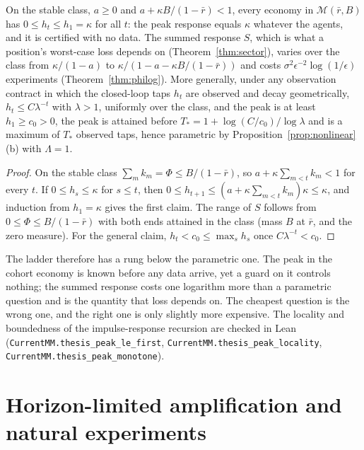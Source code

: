 \begin{corollary}\label{cor:peak}
On the stable class, $a\ge0$ and $a+\kappa B/(1-\bar r)<1$, every economy in $\mathcal M(\bar r,B)$ has $0\le h_t\le h_1=\kappa$ for all $t$: the peak response equals $\kappa$ whatever the agents, and it is certified with no data. The summed response $S$, which is what a position's worst-case loss depends on (Theorem~\ref{thm:sector}), varies over the class from $\kappa/(1-a)$ to $\kappa/(1-a-\kappa B/(1-\bar r))$ and costs $\sigma^2\epsilon^{-2}\log(1/\epsilon)$ experiments (Theorem~\ref{thm:philog}). More generally, under any observation contract in which the closed-loop taps $h_t$ are observed and decay geometrically, $h_t\le C\lambda^{-t}$ with $\lambda>1$, uniformly over the class, and the peak is at least $h_1\ge c_0>0$, the peak is attained before $T_*=1+\log(C/c_0)/\log\lambda$ and is a maximum of $T_*$ observed taps, hence parametric by Proposition~\ref{prop:nonlinear}(b) with $\Lambda=1$. \hfill\Proved
\end{corollary}

\begin{proof}
On the stable class $\sum_mk_m=\Phi\le B/(1-\bar r)$, so $a+\kappa\sum_{m<t}k_m<1$ for every $t$. If $0\le h_s\le\kappa$ for $s\le t$, then $0\le h_{t+1}\le(a+\kappa\sum_{m<t}k_m)\kappa\le\kappa$, and induction from $h_1=\kappa$ gives the first claim. The range of $S$ follows from $0\le\Phi\le B/(1-\bar r)$ with both ends attained in the class (mass $B$ at $\bar r$, and the zero measure). For the general claim, $h_t<c_0\le\max_sh_s$ once $C\lambda^{-t}<c_0$.
\end{proof}

The ladder therefore has a rung below the parametric one. The peak in the cohort economy is known before any data arrive, yet a guard on it controls nothing; the summed response costs one logarithm more than a parametric question and is the quantity that loss depends on. The cheapest question is the wrong one, and the right one is only slightly more expensive. The locality and boundedness of the impulse-response recursion are checked in Lean (\nolinkurl{CurrentMM.thesis_peak_le_first}, \nolinkurl{CurrentMM.thesis_peak_locality}, \nolinkurl{CurrentMM.thesis_peak_monotone}).

\section{Horizon-limited amplification and natural experiments}\label{sec:horizon}

